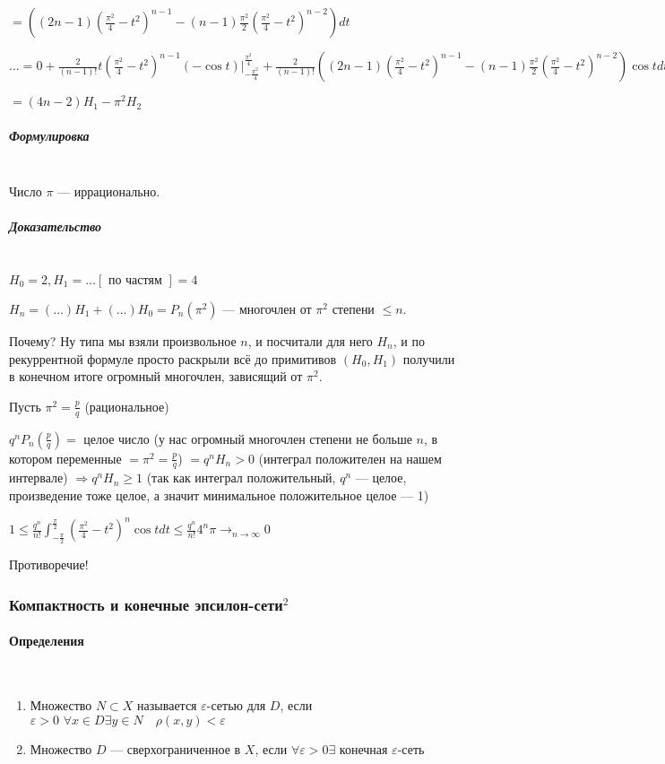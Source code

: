 \documentclass{article}
\def\dbl{\,\,}
\let\vanillaparagraph\paragraph
\let\vanillasubparagraph\subparagraph
\renewcommand{\paragraph}[1]{\vanillaparagraph{#1}\mbox{}\\}
\renewcommand{\subparagraph}[1]{\vanillasubparagraph{#1}\mbox{}\\}
\begin{document}
$= \left((2n - 1)\left(\frac{\pi^2}{4} - t^2\right)^{n - 1} - (n - 1)\frac{\pi^2}{2}\left(\frac{\pi^2}{4} - t^2\right)^{n - 2}\right)dt$

$\ldots = 0 + \frac{2}{(n - 1)!}t\left(\frac{\pi^2}{4} - t^2\right)^{n - 1}(-\cos t)|_{-\frac{\pi^2}{4}}^{\frac{\pi^2}{4}} + \frac{2}{(n -1)!}\left((2n - 1)\left(\frac{\pi^2}{4} - t^2\right)^{n - 1} - (n - 1)\frac{\pi^2}{2}\left(\frac{\pi^2}{4} - t^2\right)^{n - 2}\right)\cos tdt$

$= (4n - 2)H_1 - \pi^2H_2$


\subparagraph{Формулировка}

Число $\pi$ --- иррационально.

\subparagraph{Доказательство}

$H_0 = 2, H_1 = \ldots [\text{ по частям }] = 4$

$H_n = (\ldots)H_1 + (\ldots)H_0 = P_n(\pi^2)$ --- многочлен от $\pi^2$ степени $\le n$.

Почему? Ну типа мы взяли произвольное $n$, и посчитали для него $H_n$, и по рекуррентной формуле просто раскрыли всё до примитивов $(H_0, H_1)$  получили в конечном итоге огромный многочлен, зависящий от $\pi^2$.

Пусть $\pi^2 = \frac{p}{q}$ (рациональное)

$q^{n}P_n(\frac{p}{q}) = $ целое число (у нас огромный многочлен степени не больше $n$, в котором переменные $= \pi^2 = \frac{p}{q}$) $ = q^{n}H_n > 0$ (интеграл положителен на нашем интервале) $\Rightarrow q^{n}H_n \ge 1$ (так как интеграл положительный, $q^n$ --- целое, произведение тоже целое, а значит минимальное положительное целое --- 1)

$1 \le \frac{q^{n}}{n!}\int_{-\frac{\pi}{2}}^{\frac{\pi}{2}}{\left(\frac{\pi^2}{4} - t^2\right)^n\cos t dt} \le \frac{q^{n}}{n!}4^n\pi \rightarrow_{n \rightarrow \infty} 0$

Противоречие!

\subsubsection{Компактность и конечные эпсилон-сети\texorpdfstring{$^2$}{}}

\paragraph{Определения}

\begin{enumerate}
    \item Множество $N \subset X$ называется $\varepsilon$-сетью для $D$, если $\varepsilon > 0 \dbl \forall x \in D \exists y \in N \quad \rho(x, y) < \varepsilon$
    \item Множество $D$ --- сверхограниченное в $X$, если $\forall \varepsilon > 0 \exists$ конечная $\varepsilon$-сеть
\end{enumerate}
\end{document}
